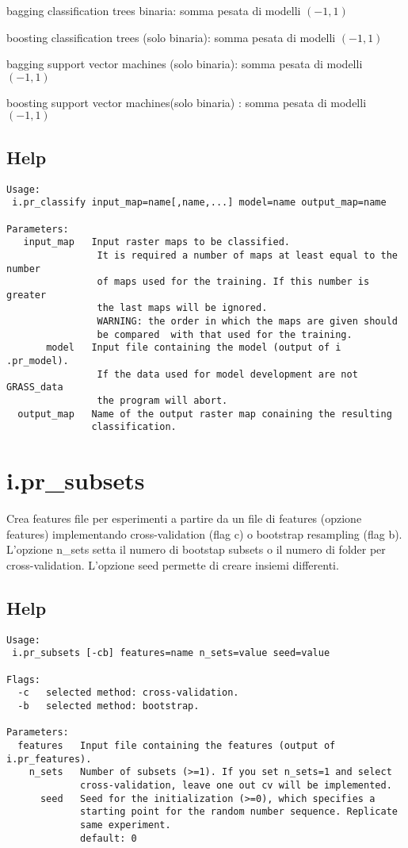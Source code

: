 \noindent
bagging classification trees binaria: somma pesata di modelli $(-1,1)$

\noindent
boosting classification trees (solo binaria): somma pesata di modelli $(-1,1)$

\noindent
bagging support vector machines (solo binaria): somma pesata di modelli $(-1,1)$

\noindent
boosting support vector machines(solo binaria) : somma pesata di modelli $(-1,1)$

\subsection*{Help}
\begin{verbatim}
Usage:
 i.pr_classify input_map=name[,name,...] model=name output_map=name

Parameters:
   input_map   Input raster maps to be classified.
                It is required a number of maps at least equal to the number
                of maps used for the training. If this number is greater
                the last maps will be ignored.
                WARNING: the order in which the maps are given should
                be compared  with that used for the training.
       model   Input file containing the model (output of i .pr_model).
                If the data used for model development are not GRASS_data
                the program will abort.
  output_map   Name of the output raster map conaining the resulting
               classification.
\end{verbatim}


\section*{i.pr\_subsets}
Crea features file per esperimenti a partire da un file di features
(opzione features) implementando cross-validation (flag c) o bootstrap
resampling (flag b). L'opzione n\_sets setta il numero di bootstap
subsets o il numero di folder per cross-validation. L'opzione seed permette di creare insiemi differenti.

\subsection*{Help}
\begin{verbatim}
Usage:
 i.pr_subsets [-cb] features=name n_sets=value seed=value

Flags:
  -c   selected method: cross-validation.
  -b   selected method: bootstrap.

Parameters:
  features   Input file containing the features (output of i.pr_features).
    n_sets   Number of subsets (>=1). If you set n_sets=1 and select
             cross-validation, leave one out cv will be implemented.
      seed   Seed for the initialization (>=0), which specifies a
             starting point for the random number sequence. Replicate
             same experiment.
             default: 0
\end{verbatim}

